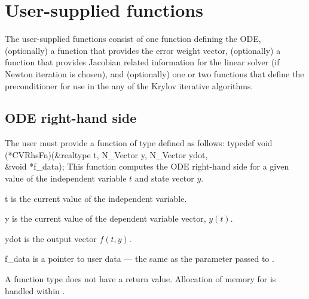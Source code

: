 \section{User-supplied functions}\label{ss:user_fct_sim}

The user-supplied functions consist of one function defining the ODE,
(optionally) a function that provides the error weight vector,
(optionally) a function that provides Jacobian related information for the linear
solver (if Newton iteration is chosen), and (optionally) one or two functions 
that define the preconditioner for use in the any of the Krylov iterative
algorithms. 

\subsection{ODE right-hand side} \label{ss:rhsFn}

The user must provide a function of type  defined as follows:
{
  typedef void (*CVRhsFn)(&realtype t, N\_Vector y, N\_Vector ydot, \\
                          &void *f\_data);
}
{
  This function computes the ODE right-hand side for a given value
  of the independent variable $t$ and state vector $y$.
}
{
  \begin{args}[f\_data]
  \item[t]
    is the current value of the independent variable.
  \item[y]
    is the current value of the dependent variable vector, $y(t)$.
  \item[ydot]
    is the output vector $f(t,y)$.
  \item[f\_data]
    is a pointer to user data --- the same as the       
    parameter passed to .   
  \end{args}
}
{
  A  function type does not have a return value.
}
{
Allocation of memory for  is handled within {\cvode}.
}


